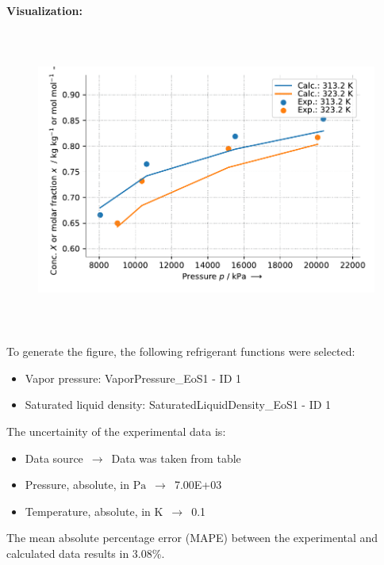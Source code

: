 \textbf{Visualization:}
%
\begin{figure}[!htp]
{\noindent\includegraphics[height=10cm, keepaspectratio]{figs/abs/abs_CarbonDioxide_ionic_liquid_[Pyrr4,1][NTf2]_MixingRule_2.pdf}}
\end{figure}
%

To generate the figure, the following refrigerant functions were selected:
\begin{itemize}
\item Vapor pressure: VaporPressure\_EoS1 - ID 1
\item Saturated liquid density: SaturatedLiquidDensity\_EoS1 - ID 1
\end{itemize}

The uncertainity of the experimental data is:
\begin{itemize}
\item Data source $\,\to\,$ Data was taken from table
\item Pressure, absolute, in $\si{\pascal}$ $\,\to\,$ 7.00E+03
\item Temperature, absolute, in $\si{\kelvin}$ $\,\to\,$ 0.1
\end{itemize}

The mean absolute percentage error (MAPE) between the experimental and calculated data results in 3.08\%.
\FloatBarrier
\newpage

